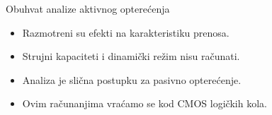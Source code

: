 \begin{frame}[label=09_1-s057]{Obuhvat analize aktivnog opterećenja}\setlength{\parskip}{2pt}\setlength{\abovedisplayskip}{4pt}\setlength{\belowdisplayskip}{4pt}\setlength{\abovedisplayshortskip}{3pt}\setlength{\belowdisplayshortskip}{3pt}
\begin{itemize}
\item Razmotreni su efekti na karakteristiku prenosa.
\item Strujni kapaciteti i dinamički režim nisu računati.
\item Analiza je slična postupku za pasivno opterećenje.
\item Ovim računanjima vraćamo se kod CMOS logičkih kola.
\end{itemize}
\end{frame}
